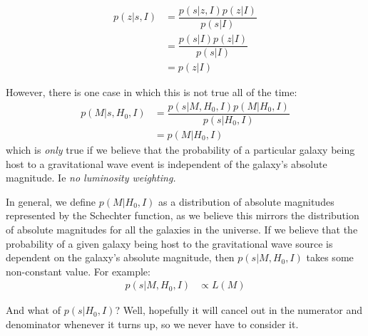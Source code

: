 \documentclass[a4paper,10pt]{article}
\begin{document}
\begin{equation}
\begin{aligned}
p(z|s,I) &= \dfrac{p(s|z,I) p(z|I)}{p(s|I)} 
\\ &= \dfrac{p(s|I) p(z|I)}{p(s|I)} 
\\ &= p(z|I)
\end{aligned}
\end{equation}

However, there is one case in which this is not true all of the time:
\begin{equation}
\begin{aligned}
p(M|s,H_0,I) &= \dfrac{p(s|M,H_0,I)p(M|H_0,I)}{p(s|H_0,I)} 
\\ &= p(M|H_0,I)
\end{aligned}
\end{equation}
which is \emph{only} true if we believe that the probability of a particular galaxy being host to a gravitational wave event is independent of the galaxy's absolute magnitude. Ie \emph{no luminosity weighting.}

In general, we define $p(M|H_0,I)$ as a distribution of absolute magnitudes represented by the Schechter function, as we believe this mirrors the distribution of absolute magnitudes for all the galaxies in the universe.  If we believe that the probability of a given galaxy being host to the gravitational wave source is dependent on the galaxy's absolute magnitude, then $p(s|M,H_0,I)$ takes some non-constant value.  For example:
\begin{equation}
\begin{aligned}
p(s|M,H_0,I) &\propto L(M)
\end{aligned}
\end{equation}

And what of $p(s|H_0,I)$?  Well, hopefully it will cancel out in the numerator and denominator whenever it turns up, so we never have to consider it.
\end{document}
